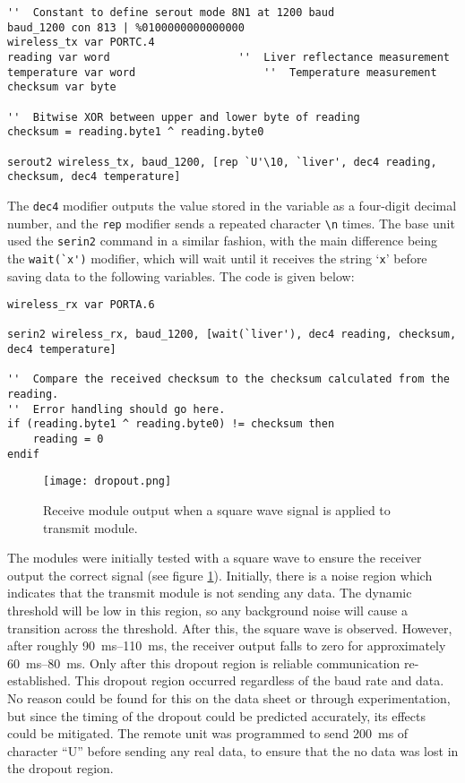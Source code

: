 \begin{lstlisting}
''  Constant to define serout mode 8N1 at 1200 baud
baud_1200 con 813 | %0100000000000000
wireless_tx var PORTC.4
reading var word 					''  Liver reflectance measurement
temperature var word					''  Temperature measurement
checksum var byte

''  Bitwise XOR between upper and lower byte of reading
checksum = reading.byte1 ^ reading.byte0

serout2 wireless_tx, baud_1200, [rep `U'\10, `liver', dec4 reading, checksum, dec4 temperature]
\end{lstlisting}

The \verb|dec4| modifier outputs the value stored in the variable as a four-digit decimal number, and the \verb|rep| modifier sends a repeated character \verb|\n| times. The base unit used the \verb|serin2| command in a similar fashion, with the main difference being the \verb|wait(`x')| modifier, which will wait until it receives the string `\verb|x|' before saving data to the following variables. The code is given below:

\begin{lstlisting}
wireless_rx var PORTA.6

serin2 wireless_rx, baud_1200, [wait(`liver'), dec4 reading, checksum, dec4 temperature]

''  Compare the received checksum to the checksum calculated from the reading. 
''  Error handling should go here.
if (reading.byte1 ^ reading.byte0) != checksum then
    reading = 0
endif
\end{lstlisting}






\begin{figure}[htb]
	\centering
	\texttt{[image: dropout.png]}
	\caption{Receive module output when a square wave signal is applied to transmit module.}
	\label{fig: dropout}
\end{figure}

The modules were initially tested with a square wave to ensure the receiver output the correct signal (see figure \ref{fig: dropout}). Initially, there is a noise region which indicates that the transmit module is not sending any data. The dynamic threshold will be low in this region, so any background noise will cause a transition across the threshold. After this, the square wave is observed. However, after roughly \SIrange{90}{110}{\milli\second}, the receiver output falls to zero for approximately \SIrange{60}{80}{\milli\second}. Only after this dropout region is reliable communication re-established. This dropout region occurred regardless of the baud rate and data. No reason could be found for this on the data sheet or through experimentation, but since the timing of the dropout could be predicted accurately, its effects could be mitigated. The remote unit was programmed to send \SI{200}{\milli\second} of character ``U'' before sending any real data, to ensure that the no data was lost in the dropout region.\\

